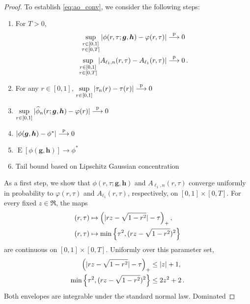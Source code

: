 \documentclass{article}
\makeatletter
\DeclareMathOperator{\expect}{E}
\theoremstyle{definition}
\newcommand{\abs}[1]{%
	\ensuremath{%
		\if@display
		\left| #1 \right|
		\else
		\lvert #1 \rvert
		\fi
	}%
}
\newcommand*{\bb}{\boldsymbol}
\def\bh{\bb{h}}
\def\bg{\bb{g}}
\makeatother
\begin{document}
\begin{bibunit}
\begin{proof}
	To establish \eqref{eq:ao_conv}, we consider the following steps:
	\begin{enumerate}
	\item For $T > 0$,
	\begin{equation}
	\label{eq:unif-Aellone-phi}
	\begin{aligned}
		\underset{\substack{r \in [0,1] \\ \tau \in [0, T]}}{\sup} \, \abs{\phi(r, \tau; \bg, \bh) - \varphi(r,\tau)} &\overset{\mathrm p}{\longrightarrow} 0 \\
		\underset{\substack{r \in [0,1] \\ \tau \in [0, T]}}{\sup} \, \abs{A_{\ell_1,n}(r, \tau) - A_{\ell_1}(r,\tau)} &\overset{\mathrm p}{\longrightarrow} 0\,.
	\end{aligned}
	\end{equation}
	\item For any $r \in [0,1]$,
		$\underset{r \in [0,1]}{\sup} \, \abs{\tau_n(r)- \tau(r)}  \overset{\mathrm p}{\longrightarrow} 0$
		\item $\underset{r \in [0,1]}{\sup} \, \abs{\widehat\phi_n(r;\bg,\bh) - \varphi(r)} \overset{\mathrm p}{\longrightarrow} 0$
		\item $\abs{\phi(\bg,\bh) - \phi^*} \overset{\mathrm p}{\longrightarrow} 0$
		\item $\expect\left[\phi(\bg,\bh)\right] \to \phi^*$
		\item Tail bound based on Lipschitz Gaussian concentration
	\end{enumerate}
As a first step, we show that $\phi(r,\tau;\bg,\bh)$ and
$A_{\ell_1,n}(r,\tau)$ converge uniformly in probability to
$\varphi(r,\tau)$ and $A_{\ell_1}(r,\tau)$, respectively, on
$[0,1]\times[0,T]$. For every fixed $z\in\Re$, the maps
\begin{equation}
	\label{eq:uniform_maps}
	\begin{aligned}
		(r,\tau)
		&\mapsto
		\left(\abs{rz-\sqrt{1-r^2}}-\tau\right)_+,\\
		(r,\tau)
		&\mapsto
		\min\left\{\tau^2,(rz-\sqrt{1-r^2})^2\right\}
	\end{aligned}
\end{equation}
are continuous on $[0,1]\times[0,T]$. Uniformly over this parameter
set,
$$
\begin{aligned}
\left(\abs{rz-\sqrt{1-r^2}}-\tau\right)_+
&\leq \abs{z}+1,\\
\min\left\{\tau^2,(rz-\sqrt{1-r^2})^2\right\}
&\leq 2z^2+2 \,. 
\end{aligned}
$$
Both envelopes are integrable under the standard normal law. Dominated

\end{proof}
\end{bibunit}
\end{document}
